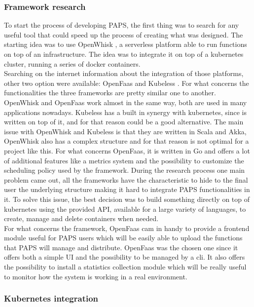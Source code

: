 \subsubsection*{Framework research}
To start the process of developing PAPS, the first thing was to search for any useful tool 
that could speed up the process of creating what was designed.  
The starting idea was to use OpenWhisk \cite{OpenWhisk}, a serverless platform able to run 
functions on top of an infrastructure. The idea was to integrate it on top of a kubernetes 
cluster, running a series of docker \cite{Docker} containers. \\
Searching on the internet information about the integration of those platforms, other two 
option were available: OpenFaas \cite{Faas} and Kubeless \cite{Kubeless}. For what concerns 
the functionalities the three frameworks are pretty similar one to another. OpenWhisk and 
OpenFaas work almost in the same way, both are used in many applications nowadays. 
Kubeless has a built in synergy with kubernetes, since is written on top of it,  and for 
that reason could be a good alternative. The main issue with OpenWhisk and Kubeless is 
that they are written in Scala and Akka, OpenWhisk also has a complex structure and for that reason 
is not optimal for a project like this. For what concerns OpenFaas, it is written
in Go and offers a lot of additional features like a metrics system and the possibility to 
customize the scheduling policy used by the framework. During the research process one main
problem came out, all the frameworks have the characteristic to hide to the final user 
the underlying structure making it hard to integrate PAPS functionalities in it.
To solve this issue, the best decision was to build something directly on top of kubernetes
using the provided API, available for a large variety of languages, to create, manage and 
delete containers when needed. \\
For what concerns the framework, OpenFaas cam in handy to provide a frontend module 
useful for PAPS users which will be easily able to upload the functions that PAPS
will manage and distribute. OpenFaas was the chosen one since it offers both a
simple UI and the possibility to be managed by a cli. It also offers the possibility to 
install a statistics collection module which will be really useful to monitor how the
system is working in a real environment.

\subsubsection*{Kubernetes integration}